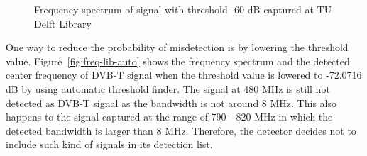 \begin{figure}[H]
\begin{subfigure}[b]{0.45\textwidth}
    \end{subfigure}
    \caption{Frequency spectrum of signal with threshold -60 dB captured at TU Delft Library}\label{fig:freq-lib-60}
\end{figure}

One way to reduce the probability of misdetection is by lowering the threshold value. Figure~\ref{fig:freq-lib-auto} shows the frequency spectrum and the detected center frequency of DVB-T signal when the threshold value is lowered to -72.0716 dB by using automatic threshold finder. The signal at 480 MHz is still not detected as DVB-T signal as the bandwidth is not around 8 MHz. This also happens to the signal captured at the range of 790 - 820 MHz in which the detected bandwidth is larger than 8 MHz. Therefore, the detector decides not to include such kind of signals in its detection list.

